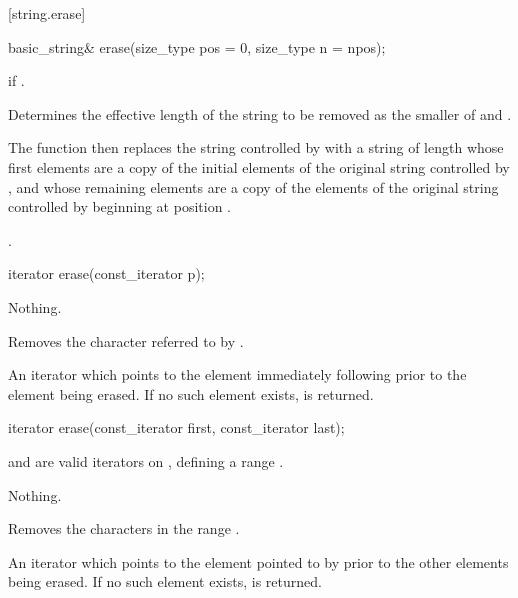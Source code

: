 [string.erase]{}

%
\begin{itemdecl}
basic_string& erase(size_type pos = 0, size_type n = npos);
\end{itemdecl}

\begin{itemdescr}
\pnum
\throws
{}
if 
.

\pnum
\effects
Determines the effective length 
of the string to be removed as the smaller of  and
.

\pnum
The function then replaces the string controlled by
with a string of length
whose first  elements are a copy of the initial elements of the original string controlled by
,
and whose remaining elements are a copy of the elements of the original string controlled by
beginning at position
.

\pnum
\returns
{}.
\end{itemdescr}

%
\begin{itemdecl}
iterator erase(const_iterator p);
\end{itemdecl}

\begin{itemdescr}
\pnum
\throws Nothing.

\pnum
\effects
Removes the character referred to by .

\pnum
\returns
An iterator which points to the element immediately following  prior to
the element being erased.
If no such element exists,
is returned.
\end{itemdescr}

%
\begin{itemdecl}
iterator erase(const_iterator first, const_iterator last);
\end{itemdecl}

\begin{itemdescr}
\pnum
\requires
{} and  are valid iterators on
,
defining a range
\tcode{[first, last)}.

\pnum
\throws Nothing.

\pnum
\effects
Removes the characters in the range
\tcode{[first, last)}.

\pnum
\returns
An iterator which points to the element pointed to by  prior to
the other elements being erased.
If no such element exists,
is returned.
\end{itemdescr}

